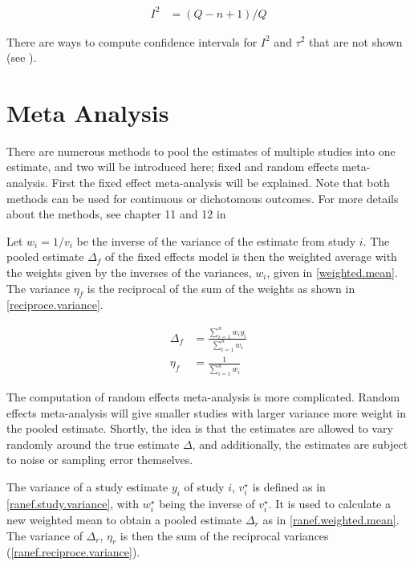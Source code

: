 \documentclass[11pt,a4paper,twoside]{book}\usepackage[]{graphicx}\usepackage[]{color}
\begin{document}
\begin{align}
I^2 &= (Q - n + 1)/Q \label{I2.proportion}
\end{align}

There are ways to compute confidence intervals for $I^2$ and $\tau^2$ that are not shown (see \cite[122]{metaanalysis}).

\section{Meta Analysis}
There are numerous methods to pool the estimates of multiple studies into one estimate, and two will be introduced here; fixed and random effects meta-analysis.
First the fixed effect meta-analysis will be explained. Note that both methods can be used for continuous or dichotomous outcomes. For more details about the methods, see chapter 11 and 12 in \citet{metaanalysis}


\vspace{0mm}
Let $w_i = 1/v_{i}$ be the inverse of the variance of the estimate from study $i$. The pooled estimate $\Delta_{f}$ of the fixed effects model is then the weighted average with the weights given by the inverses of the variances, $w_{i}$, given in \ref{weighted.mean}. The variance $\eta_{f}$ is the reciprocal of the sum of the weights as shown in \ref{reciproce.variance}.

\begin{align}
\Delta_{f} &= \frac{\sum_{i = 1}^n w_{i}y_{i}}{\sum_{i = 1}^n w_{i}} \label{weighted.mean} \\
\eta_{f} &= \frac{1}{\sum_{i = 1}^n w_{i}} \label{reciproce.variance}
\end{align}

The computation of random effects meta-analysis is more complicated. Random effects meta-analysis will give smaller studies with larger variance more weight in the pooled estimate. Shortly, the idea is that the estimates are allowed to vary randomly around the true estimate $\Delta$, and additionally, the estimates are subject to noise or sampling error themselves. 

\vspace{0mm}
The variance of a study estimate $y_{i}$ of study $i$, $v_{i}^\star$ is defined as in \ref{ranef.study.variance}, with $w_{i}^\star$ being the inverse of $v_{i}^\star$. It is used to calculate a new weighted mean to obtain a pooled estimate $\Delta_{r}$ as in \ref{ranef.weighted.mean}. The variance of $\Delta_{r}$, $\eta_{r}$ is then the sum of the reciprocal variances (\ref{ranef.reciproce.variance}).
\end{document}
